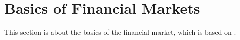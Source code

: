 \section{Basics of Financial Markets}

This section is about the basics of the financial market, which is based on \citet{cartea2015algorithmic}.
